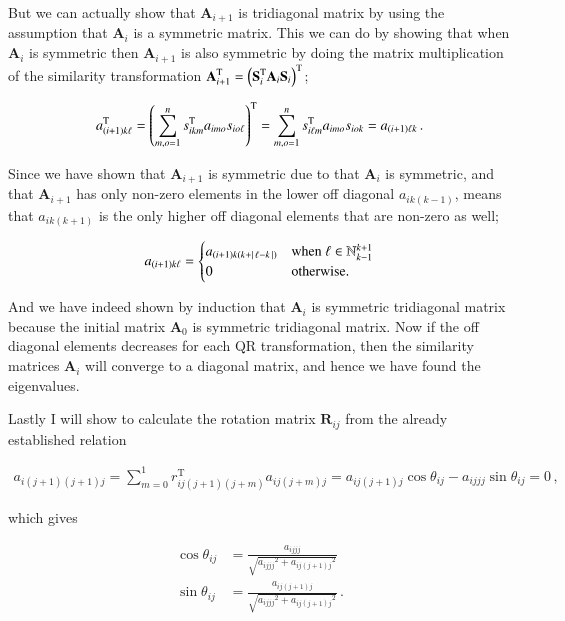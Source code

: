 \documentclass[11pt,english,a4paper]{article}
\begin{document}
\begin{flushleft}
But we can actually show that $\textbf{A}_{i+1}$ is tridiagonal matrix by using the assumption that $\textbf{A}_i$ is a symmetric matrix. This we can do by showing that when $\textbf{A}_i$ is symmetric then $\textbf{A}_{i+1}$ is also symmetric by doing the matrix multiplication of the similarity transformation $\textbf{A}_{i+1}^{\text{T}} = \left({\textbf{S}_i^{\text{T}}\textbf{A}_i \textbf{S}_i}\right)^\text{T}$;

\begin{align*}
a_{(i+1)k\ell}^{\text{T}} = \left({\sum_{m,o=1}^n s_{ikm}^{\text{T}}a_{imo} s_{io\ell}}\right)^{\text{T}} = \sum_{m,o=1}^n s_{i\ell m}^{\text{T}}a_{imo} s_{iok} = a_{(i+1)\ell k} \,.
\end{align*}

Since we have shown that $\textbf{A}_{i+1}$ is symmetric due to that $\textbf{A}_i$ is symmetric, and that $\textbf{A}_{i+1}$ has only non-zero elements in the lower off diagonal $a_{ik(k-1)}$, means that $a_{ik(k+1)}$ is the only higher off diagonal elements that are non-zero as well;

\begin{align}
a_{(i+1)k\ell} = \begin{cases} a_{(i+1)k(k+\left\vert{\,\ell-k\,}\right\vert)} & \text{when } \ell \in \mathbb{N}_{k-1}^{k+1} \\ 0 & \text{otherwise.}\end{cases}
\label{eq_27}
\end{align}

And we have indeed shown by induction that $\textbf{A}_i$ is symmetric tridiagonal matrix because the initial matrix $\textbf{A}_0$ is symmetric tridiagonal matrix. Now if the off diagonal elements decreases for each QR transformation, then the similarity matrices $\textbf{A}_i$ will converge to a diagonal matrix, and hence we have found the eigenvalues. \linebreak

Lastly I will show to calculate the rotation matrix $\textbf{R}_{ij}$ from the already established relation

\begin{align*}
a_{i(j+1)(j+1)j} = \sum_{m=0}^1 r_{ij(j+1)(j+m)}^{\text{T}} a_{ij(j+m)j} = a_{ij(j+1)j}\cos\theta_{ij}-a_{ijjj}\sin\theta_{ij} = 0 \,,
\end{align*}

which gives

\begin{align}
\cos\theta_{ij} &= \frac{a_{ijjj}}{\sqrt{{a_{ijjj}}^2+{a_{ij(j+1)j}}^2}}
\label{eq_28}
\\
\sin\theta_{ij} &= \frac{a_{ij(j+1)j}}{\sqrt{{a_{ijjj}}^2+{a_{ij(j+1)j}}^2}} \,.
\label{eq_29}
\end{align}


\end{flushleft}
\end{document}
